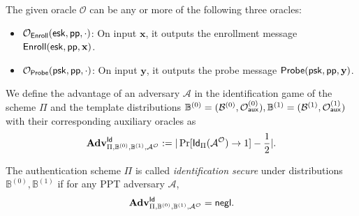 The given oracle $\mathcal{O}$ can be any or more of the following three oracles:

\begin{itemize}
	\item $\mathcal{O}_{\sf Enroll}({\sf esk}, {\sf pp}, \cdot)$: On input $\mathbf{x}$, it outputs the enrollment message ${\sf Enroll}({\sf esk}, {\sf pp}, \mathbf{x})$.

	\item $\mathcal{O}_{\sf Probe}({\sf psk}, {\sf pp}, \cdot)$: On input $\mathbf{y}$, it outputs the probe message ${\sf Probe}({\sf psk}, {\sf pp}, \mathbf{y})$.

\end{itemize}

We define the advantage of an adversary $\mathcal{A}$ in the identification game of the scheme $\Pi$ and the template distributions $\mathbb{B}^{(0)} = (\mathcal{B}^{(0)}, \mathcal{O}_{\sf aux}^{(0)}), \mathbb{B}^{(1)} = (\mathcal{B}^{(1)}, \mathcal{O}_{\sf aux}^{(1)})$ with their corresponding auxiliary oracles as
\[
	\mathbf{Adv}^{\sf Id}_{\Pi, \mathbb{B}^{(0)}, \mathbb{B}^{(1)}, \mathcal{A}^\mathcal{O}} := |\Pr[{\sf Id}_{\Pi}(\mathcal{A}^\mathcal{O}) \to 1] - \frac{1}{2}|.
\]

The authentication scheme $\Pi$ is called \emph{identification secure} under distributions $\mathbb{B}^{(0)}, \mathbb{B}^{(1)}$ if for any PPT adversary $\mathcal{A}$,
\[
	\mathbf{Adv}^{\sf Id}_{\Pi, \mathbb{B}^{(0)}, \mathbb{B}^{(1)}, \mathcal{A^\mathcal{O}}} = \mathsf{negl}.
\]


% 

\nocite{*}
\printbibliography



